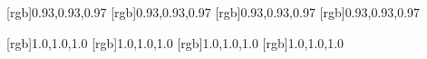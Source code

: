 \documentclass[11pt]{memoir}
\begin{document}
  [rgb]{0.93,0.93,0.97}
  [rgb]{0.93,0.93,0.97}
  [rgb]{0.93,0.93,0.97}
  [rgb]{0.93,0.93,0.97}
  \begin{paracol}{2}
  \begin{leftcolumn}
  
  \end{leftcolumn}
  \end{paracol}
  [rgb]{1.0,1.0,1.0}
  [rgb]{1.0,1.0,1.0}
  [rgb]{1.0,1.0,1.0}
  [rgb]{1.0,1.0,1.0}

  \begin{paracol}{2}
  \begin{leftcolumn}
  
  \end{leftcolumn}
  \end{paracol}

  \begin{paracol}{2}
  \begin{leftcolumn}
  
  \end{leftcolumn}
  \end{paracol}

  \begin{paracol}{2}
  \begin{leftcolumn}
  
  
  \end{leftcolumn}
  \end{paracol}

  \begin{paracol}{2}
  \begin{leftcolumn}
  
  \end{leftcolumn}
  \end{paracol}

  \begin{paracol}{2}
  \begin{leftcolumn}
  
  \end{leftcolumn}
  \end{paracol}

  \begin{paracol}{2}
  \begin{leftcolumn}
  
  \end{leftcolumn}
  \end{paracol}
\end{document}
